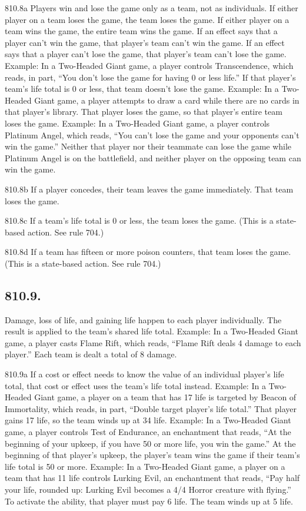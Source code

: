 810.8a Players win and lose the game only as a team, not as individuals. If either player on a team loses the game, the team loses the game. If either player on a team wins the game, the entire team wins the game. If an effect says that a player can’t win the game, that player’s team can’t win the game. If an effect says that a player can’t lose the game, that player’s team can’t lose the game.
Example: In a Two-Headed Giant game, a player controls Transcendence, which reads, in part, “You don’t lose the game for having 0 or less life.” If that player’s team’s life total is 0 or less, that team doesn’t lose the game.
Example: In a Two-Headed Giant game, a player attempts to draw a card while there are no cards in that player’s library. That player loses the game, so that player’s entire team loses the game.
Example: In a Two-Headed Giant game, a player controls Platinum Angel, which reads, “You can’t lose the game and your opponents can’t win the game.” Neither that player nor their teammate can lose the game while Platinum Angel is on the battlefield, and neither player on the opposing team can win the game.

810.8b If a player concedes, their team leaves the game immediately. That team loses the game.

810.8c If a team’s life total is 0 or less, the team loses the game. (This is a state-based action. See rule 704.)

810.8d If a team has fifteen or more poison counters, that team loses the game. (This is a state-based action. See rule 704.)

\subsection*{810.9.}
Damage, loss of life, and gaining life happen to each player individually. The result is applied to the team’s shared life total.
Example: In a Two-Headed Giant game, a player casts Flame Rift, which reads, “Flame Rift deals 4 damage to each player.” Each team is dealt a total of 8 damage.

810.9a If a cost or effect needs to know the value of an individual player’s life total, that cost or effect uses the team’s life total instead.
Example: In a Two-Headed Giant game, a player on a team that has 17 life is targeted by Beacon of Immortality, which reads, in part, “Double target player’s life total.” That player gains 17 life, so the team winds up at 34 life.
Example: In a Two-Headed Giant game, a player controls Test of Endurance, an enchantment that reads, “At the beginning of your upkeep, if you have 50 or more life, you win the game.” At the beginning of that player’s upkeep, the player’s team wins the game if their team’s life total is 50 or more.
Example: In a Two-Headed Giant game, a player on a team that has 11 life controls Lurking Evil, an enchantment that reads, “Pay half your life, rounded up: Lurking Evil becomes a 4/4 Horror creature with flying.” To activate the ability, that player must pay 6 life. The team winds up at 5 life.

